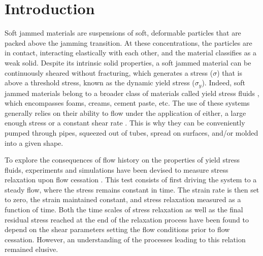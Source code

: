 \documentclass[%
preprint,
 amsmath,amssymb,
 aps,
]{revtex4-1}
\begin{document}
\maketitle


\section{Introduction}\label{sec1}
Soft jammed materials are suspensions of soft, deformable particles that are packed above the jamming transition. At these concentrations, the particles are in contact, interacting elastically with each other, and the material classifies as a weak solid. Despite its intrinsic solid properties, a soft jammed material can be continuously sheared without fracturing, which generates a stress ($\sigma$) that is
above a threshold stress, known as the dynamic yield stress ($\sigma_y$). Indeed, soft jammed materials belong to a broader class of materials called yield stress fluids \cite{nguyen1992measuring,bonn2017yield}, which encompasses foams, creams,
cement paste, etc. The use of these systems generally relies on their ability to flow under the application of either, a large enough stress or a constant shear rate \cite{nelson2019designing,nelson2020embedded}. This is why they can be conveniently pumped through pipes, squeezed out of tubes, spread on surfaces, and/or molded into a given shape.

To explore the consequences of flow history on the properties of yield stress fluids, experiments and simulations have been devised to measure stress relaxation upon flow cessation \cite{mohan2015build,hendricks2019nonmonotonic,sudreau2022residual,vasisht2022residual,sudreau2022shear}. This test
consists of first driving the system to a steady flow, where the stress remains constant in time. The strain rate is then set to zero, the strain maintained constant, and stress relaxation  measured as a function of time. Both the time scales of stress relaxation as well as the final residual stress reached at the
end of the relaxation process have been found to depend on the shear parameters setting the flow
conditions prior to flow cessation. However, an understanding of the processes leading to this relation remained elusive.
\end{document}
